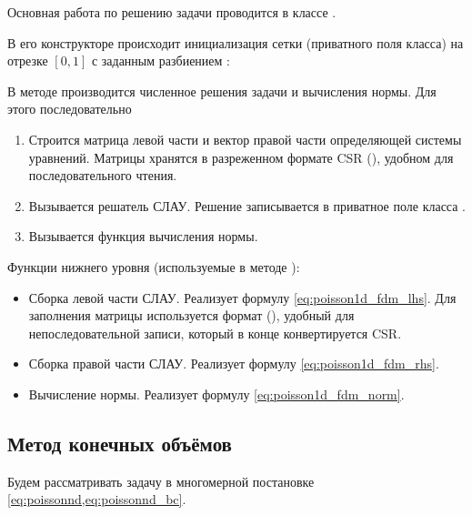 Основная работа по решению задачи проводится в классе .

В его конструкторе происходит инициализация сетки (приватного поля класса) на отрезке $[0, 1]$ с заданным разбиением
:

В методе  производится численное решения задачи и вычисления нормы.
Для этого последовательно
\begin{enumerate}
\item Строится матрица левой части и вектор правой части определяющей системы уравнений.
      Матрицы хранятся в разреженном формате CSR (), удобном для последовательного чтения.
\item Вызывается решатель СЛАУ. Решение записывается в приватное поле класса .
\item Вызывается функция вычисления нормы.
\end{enumerate}


Функции нижнего уровня (используемые в методе ):
\begin{itemize}
\item
  Сборка левой части СЛАУ. Реализует формулу \eqref{eq:poisson1d_fdm_lhs}.
  Для заполнения матрицы используется формат  (), удобный для непоследовательной записи, который в конце конвертируется CSR.
\item
  Сборка правой части СЛАУ. Реализует формулу \eqref{eq:poisson1d_fdm_rhs}.
\item
  Вычисление нормы. Реализует формулу \eqref{eq:poisson1d_fdm_norm}.
\end{itemize}

\subsection{Метод конечных объёмов}
\label{sec:FVM}
Будем рассматривать задачу в многомерной постановке \cref{eq:poissonnd,eq:poissonnd_bc}.

